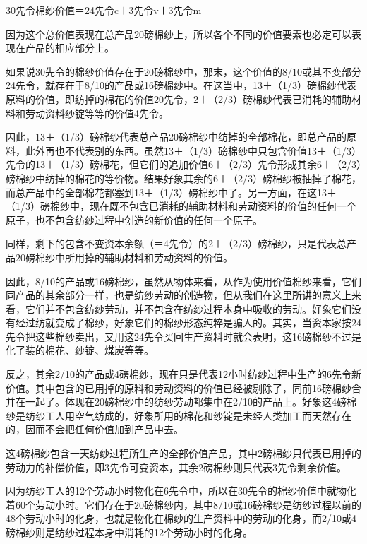 \documentclass{ctexbook}
\begin{document}
    \begin{center}
        30先令棉纱价值＝24先令c＋3先令v＋3先令m
    \end{center}
    
    因为这个总价值表现在总产品20磅棉纱上，所以各个不同的价值要素也必定可以表现在产品的相应部分上。

    如果说30先令的棉纱价值存在于20磅棉纱中，那末，这个价值的8/10或其不变部分24先令，就存在于8/10的产品或16磅棉纱中。在这当中，13＋（1/3）磅棉纱代表原料的价值，即纺掉的棉花的价值20先令，2＋（2/3）磅棉纱代表已消耗的辅助材料和劳动资料纱锭等等的价值4先令。

    因此，13＋（1/3）磅棉纱代表总产品20磅棉纱中纺掉的全部棉花，即总产品的原料，此外再也不代表别的东西。虽然13＋（1/3）磅棉纱中只包含价值13＋（1/3）先令的13＋（1/3）磅棉花，但它们的追加价值6＋（2/3）先令形成其余6＋（2/3）磅棉纱中纺掉的棉花的等价物。结果好象其余的6＋（2/3）磅棉纱被抽掉了棉花，而总产品中的全部棉花都塞到13＋（1/3）磅棉纱中了。另一方面，在这13＋（1/3）磅棉纱中，现在既不包含已消耗的辅助材料和劳动资料的价值的任何一个原子，也不包含纺纱过程中创造的新价值的任何一个原子。

    同样，剩下的包含不变资本余额（＝4先令）的2＋（2/3）磅棉纱，只是代表总产品20磅棉纱中所用掉的辅助材料和劳动资料的价值。

    因此，8/10的产品或16磅棉纱，虽然从物体来看，从作为使用价值棉纱来看，它们同产品的其余部分一样，也是纺纱劳动的创造物，但从我们在这里所讲的意义上来看，它们并不包含纺纱劳动，并不包含在纺纱过程本身中吸收的劳动。好象它们没有经过纺就变成了棉纱，好象它们的棉纱形态纯粹是骗人的。其实，当资本家按24先令把这些棉纱卖出，又用这24先令买回生产资料时就会表明，这16磅棉纱不过是化了装的棉花、纱锭、煤炭等等。

    反之，其余2/10的产品或4磅棉纱，现在只是代表12小时纺纱过程中生产的6先令新价值。其中包含的已用掉的原料和劳动资料的价值已经被剔除了，同前16磅棉纱合并在一起了。体现在20磅棉纱中的纺纱劳动都集中在2/10的产品上。好象这4磅棉纱是纺纱工人用空气纺成的，好象所用的棉花和纱锭是未经人类加工而天然存在的，因而不会把任何价值加到产品中去。

    这4磅棉纱包含一天纺纱过程所生产的全部价值产品，其中2磅棉纱只代表已用掉的劳动力的补偿价值，即3先令可变资本，其余2磅棉纱则只代表3先令剩余价值。

    因为纺纱工人的12个劳动小时物化在6先令中，所以在30先令的棉纱价值中就物化着60个劳动小时。它们存在于20磅棉纱内，其中8/10或16磅棉纱是纺纱过程以前的48个劳动小时的化身，也就是物化在棉纱的生产资料中的劳动的化身，而2/10或4磅棉纱则是纺纱过程本身中消耗的12个劳动小时的化身。
\end{document}
